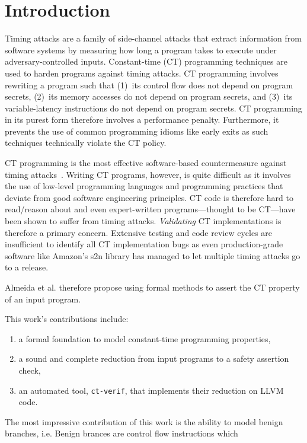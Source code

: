 \section{Introduction}

Timing attacks are a family of side-channel attacks that extract information from software systems by measuring how long a program takes to execute under adversary-controlled inputs.
Constant-time (CT) programming techniques are used to harden programs against timing attacks.
CT programming involves rewriting a program such that (1)~its control flow does not depend on program secrets, (2)~its memory accesses do not depend on program secrets, and (3)~its variable-latency instructions do not depend on program secrets.
CT programming in its purest form therefore involves a performance penalty.
Furthermore, it prevents the use of common programming idioms like early exits as such techniques technically violate the CT policy.

CT programming is the most effective software-based countermeasure against timing attacks~\cite{bernstein_cache_timing_attacks, dsa_exponentiations}.
Writing CT programs, however, is quite difficult as it involves the use of low-level programming languages and programming practices that deviate from good software engineering principles.
CT code is therefore hard to read/reason about and even expert-written programs---thought to be CT---have been shown to suffer from timing attacks.
\emph{Validating} CT implementations is therefore a primary concern.
Extensive testing and code review cycles are insufficient to identify all CT implementation bugs as even production-grade software like Amazon's s2n library has managed to let multiple timing attacks go to a release.

Almeida et al. therefore propose using formal methods to assert the CT property of an input program.

This work's contributions include:
\begin{enumerate}[label=(\roman*)]
  \item a formal foundation to model constant-time programming properties,
  \item a sound and complete reduction from input programs to a safety assertion check,
  \item an automated tool, \texttt{ct-verif}, that implements their reduction on LLVM code.
\end{enumerate}

The most impressive contribution of this work is the ability to model benign branches, i.e.
Benign brances are control flow instructions which
